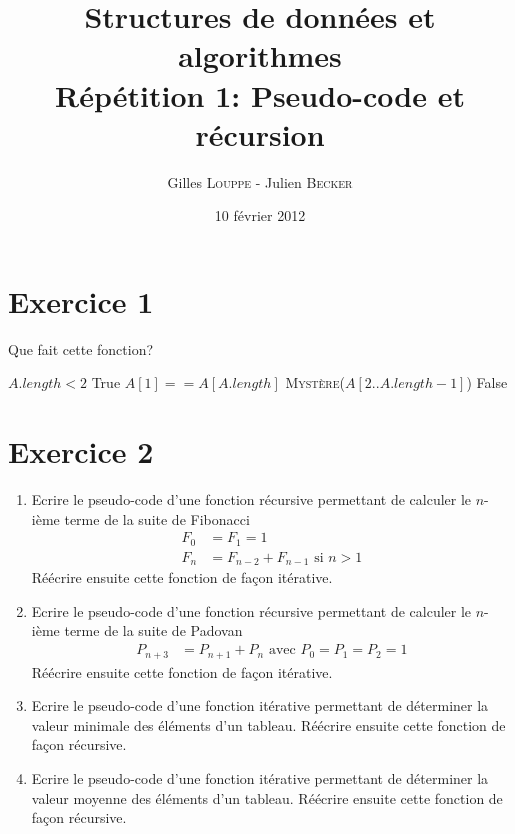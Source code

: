 \documentclass[a4paper,10pt]{article}
\title{
    \textbf{Structures de données et algorithmes}\\
    Répétition 1: Pseudo-code et récursion
}
\author{Gilles \textsc{Louppe} - Julien \textsc{Becker}}
\date{10 février 2012}
\begin{document}
\maketitle

\section*{Exercice 1}

Que fait cette fonction?

\begin{codebox}
    \li \If $A.length < 2$
    \li \Then   \Return True
    \li \Else
    \li       \If $A[1] == A[A.length]$
    \li       \Then \Return \textsc{Mystère}($A[2..A.length-1]$)
    \li       \Else
    \li             \Return False
              \End
        \End
    \End
\end{codebox}

\section*{Exercice 2}

\begin{enumerate}
\item Ecrire le pseudo-code d'une fonction récursive permettant de calculer le $n$-ième terme de la suite de Fibonacci
\begin{align*}
F_0 &= F_1 = 1 \\
F_n &= F_{n-2} + F_{n-1} \text{ si } n > 1
\end{align*}
Réécrire ensuite cette fonction de façon itérative.

\item Ecrire le pseudo-code d'une fonction récursive permettant de calculer le $n$-ième terme de la suite de Padovan
\begin{align*}
P_{n+3} &= P_{n+1} + P_n \text{ avec } P_0 = P_1 = P_2 = 1
\end{align*}
Réécrire ensuite cette fonction de façon itérative.

\item Ecrire le pseudo-code d'une fonction itérative permettant de déterminer la valeur minimale des éléments d'un tableau. Réécrire ensuite cette fonction de façon récursive.

\item Ecrire le pseudo-code d'une fonction itérative permettant de déterminer la valeur moyenne des éléments d'un tableau. Réécrire ensuite cette fonction de façon récursive.

\end{enumerate}
\end{document}

